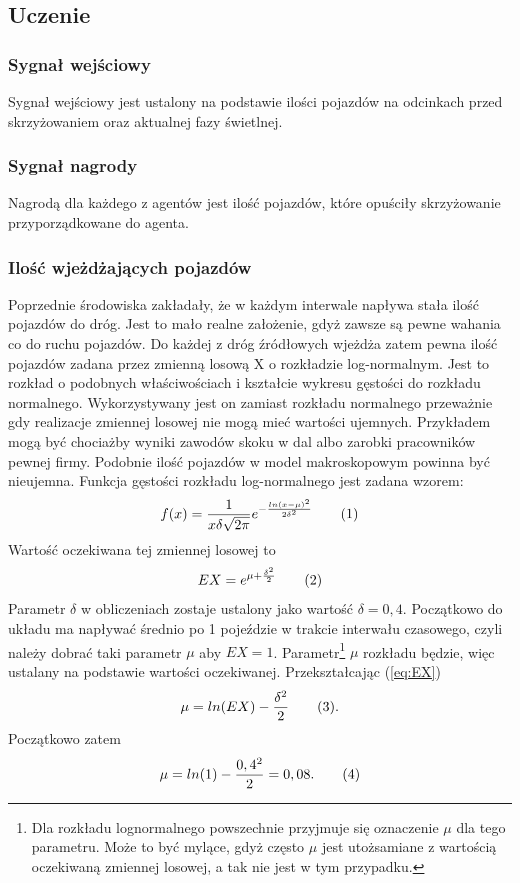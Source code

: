 \documentclass[12pt]{book}
\theoremstyle{plain}
\newcommand\addtag{\refstepcounter{equation}
\renewcommand{\labelenumii}{\theenumii}
\renewcommand{\theenumii}{\theenumi.\arabic{enumii}.}
\tag{\theequation}}
\newcommand{\myref}[1]{(\ref{#1})}
\begin{document}
\subsection{Uczenie}
\subsubsection*{Sygnał wejściowy}
Sygnał wejściowy jest ustalony na podstawie ilości pojazdów na odcinkach przed skrzyżowaniem oraz aktualnej fazy świetlnej.
\subsubsection*{Sygnał nagrody}
Nagrodą dla każdego z agentów jest ilość pojazdów, które opuściły skrzyżowanie przyporządkowane do agenta.
\subsubsection{Ilość wjeżdżających pojazdów}
Poprzednie środowiska zakładały, że w każdym interwale napływa stała ilość pojazdów do dróg. Jest to mało realne założenie, gdyż zawsze są pewne wahania co do ruchu pojazdów. Do każdej z dróg źródłowych wjeżdża zatem pewna ilość pojazdów zadana przez zmienną losową X o rozkładzie log-normalnym. Jest to rozkład o podobnych właściwościach i kształcie wykresu gęstości do rozkładu normalnego. Wykorzystywany jest on zamiast rozkładu normalnego przeważnie gdy realizacje zmiennej losowej nie mogą mieć wartości ujemnych. Przykładem mogą być chociażby wyniki zawodów skoku w dal albo zarobki pracowników pewnej firmy. Podobnie ilość pojazdów w model makroskopowym powinna być nieujemna. Funkcja gęstości rozkładu log-normalnego jest zadana wzorem:
\[ f(x)=\frac{1}{x\delta\sqrt{2\pi}}e^{-\frac{ln(x-\mu)^2}{2\delta^2}} \addtag \]
Wartość oczekiwana tej zmiennej losowej to \[EX=e^{\mu+\frac{\delta^2}{2}} \addtag \label{eq:EX}\] Parametr $\delta$ w obliczeniach zostaje ustalony jako wartość $\delta=0,4$. Początkowo do układu ma napływać średnio po 1 pojeździe w trakcie interwału czasowego, czyli należy dobrać taki parametr $\mu$ aby $EX=1$. Parametr\footnote{Dla rozkładu lognormalnego powszechnie przyjmuje się oznaczenie $\mu$ dla tego parametru. Może to być mylące, gdyż często $\mu$ jest utożsamiane z wartością oczekiwaną zmiennej losowej, a tak nie jest w tym przypadku. }  $\mu$ rozkładu będzie, więc ustalany na podstawie wartości oczekiwanej. Przekształcając \myref{eq:EX} \[\mu=ln(EX)-\frac{\delta^2}{2} \addtag \label{eq:mu}.\] Początkowo zatem \[\mu=ln(1)-\frac{0,4^2}{2}=0,08. \addtag \] 
\end{document}
